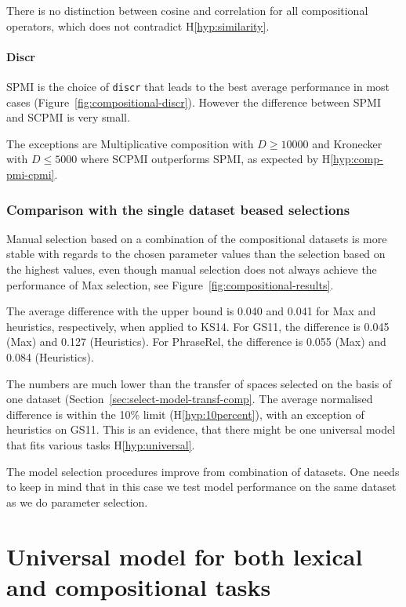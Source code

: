 There is no distinction between cosine and correlation for all compositional operators, which does not contradict H\ref{hyp:similarity}.

\subsubsection{Discr}
\label{sec:discr-compositional}



SPMI is the choice of \texttt{discr} that leads to the best average performance in most cases (Figure~\ref{fig:compositional-discr}). However the difference between SPMI and SCPMI is very small.

The exceptions are Multiplicative composition with $D \geq 10000$ and Kronecker with $D \leq 5000$ where SCPMI outperforms SPMI, as expected by H\ref{hyp:comp-pmi-cpmi}.

\subsection{Comparison with the single dataset beased selections}
\label{sec:comp-with-single-comp}

Manual selection based on a combination of the compositional datasets is more stable with regards to the chosen parameter values than the selection based on the highest values, even though manual selection does not always achieve the performance of Max selection, see Figure~\ref{fig:compositional-results}.

The average difference with the upper bound is 0.040 and 0.041 for Max and heuristics, respectively, when applied to KS14. For GS11, the difference is 0.045 (Max) and 0.127 (Heuristics). For PhraseRel, the difference is 0.055 (Max) and 0.084 (Heuristics).

The numbers are much lower than the transfer of spaces selected on the basis of one dataset (Section~\ref{sec:select-model-transf-comp}. The average normalised difference is within the 10\% limit (H\ref{hyp:10percent}), with an exception of heuristics on GS11. This is an evidence, that there might be one universal model that fits various tasks H\ref{hyp:universal}.

The model selection procedures improve from combination of datasets. One needs to keep in mind that in this case we test model performance on the same dataset as we do parameter selection.

\chapter[Universal model]{Universal model for both lexical and compositional tasks}
\label{sec:universal-param-selection}

